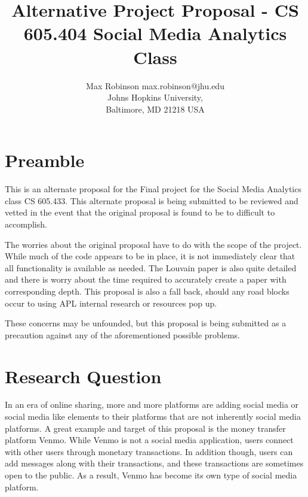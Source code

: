\documentclass[jair,twoside,11pt,theapa]{article}
\begin{document}
\title{Alternative Project Proposal - CS 605.404 Social Media Analytics Class}


\author{\name Max Robinson \email max.robinson@jhu.edu \\
	\addr Johns Hopkins University,\\
	Baltimore, MD 21218 USA
}

\maketitle


\section{Preamble}
This is an alternate proposal for the Final project for the Social Media Analytics class CS 605.433. This alternate proposal is being submitted to be reviewed and vetted in the event that the original proposal is found to be to difficult to accomplish. 

The worries about the original proposal have to do with the scope of the project. While much of the code appears to be in place, it is not immediately clear that all functionality is available as needed. The Louvain paper is also quite detailed and there is worry about the time required to accurately create a paper with corresponding depth. This proposal is also a fall back, should any road blocks occur to using APL internal research or resources pop up.

These concerns may be unfounded, but this proposal is being submitted as a precaution against any of the aforementioned possible problems. 


\section{Research Question}
In an era of online sharing, more and more platforms are adding social media or social media like elements to their platforms that are not inherently social media platforms. A great example and target of this proposal is the money transfer platform Venmo. While Venmo is not a social media application, users connect with other users through monetary transactions. In addition though, users can add messages along with their transactions, and these transactions are sometimes open to the public. As a result, Venmo has become its own type of social media platform. 
\end{document}
